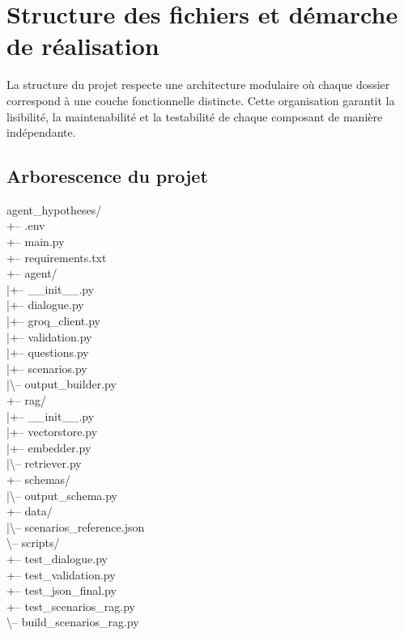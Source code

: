 \documentclass[12pt, a4paper]{report}
\begin{document}
\section{Structure des fichiers et démarche de réalisation}

La structure du projet respecte une architecture modulaire où chaque dossier correspond à une couche fonctionnelle distincte. Cette organisation garantit la lisibilité, la maintenabilité et la testabilité de chaque composant de manière indépendante.

\subsection{Arborescence du projet}

\begin{codebox}
agent\_hypotheses/\\
\quad{}+-- .env\\
\quad{}+-- main.py\\
\quad{}+-- requirements.txt\\
\quad{}+-- agent/\\
\quad{}|\quad{}+-- \_\_init\_\_.py\\
\quad{}|\quad{}+-- dialogue.py\\
\quad{}|\quad{}+-- groq\_client.py\\
\quad{}|\quad{}+-- validation.py\\
\quad{}|\quad{}+-- questions.py\\
\quad{}|\quad{}+-- scenarios.py\\
\quad{}|\quad{}\textbackslash{}-- output\_builder.py\\
\quad{}+-- rag/\\
\quad{}|\quad{}+-- \_\_init\_\_.py\\
\quad{}|\quad{}+-- vectorstore.py\\
\quad{}|\quad{}+-- embedder.py\\
\quad{}|\quad{}\textbackslash{}-- retriever.py\\
\quad{}+-- schemas/\\
\quad{}|\quad{}\textbackslash{}-- output\_schema.py\\
\quad{}+-- data/\\
\quad{}|\quad{}\textbackslash{}-- scenarios\_reference.json\\
\quad{}\textbackslash{}-- scripts/\\
\quad{}\quad{}\quad{}+-- test\_dialogue.py\\
\quad{}\quad{}\quad{}+-- test\_validation.py\\
\quad{}\quad{}\quad{}+-- test\_json\_final.py\\
\quad{}\quad{}\quad{}+-- test\_scenarios\_rag.py\\
\quad{}\quad{}\quad{}\textbackslash{}-- build\_scenarios\_rag.py
\end{codebox}
\end{document}
